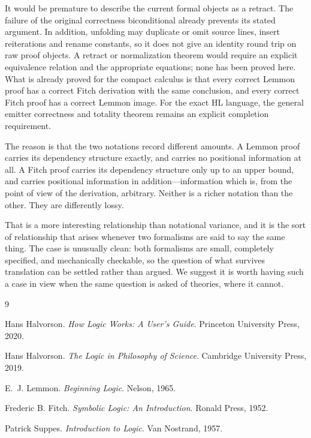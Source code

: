 \documentclass[11pt]{article}
\theoremstyle{plain}
\theoremstyle{definition}
\theoremstyle{remark}
\begin{document}
It would be premature to describe the current formal objects as a retract.
The failure of the original correctness biconditional already prevents its
stated argument. In addition, unfolding may duplicate or omit source lines,
insert reiterations and rename constants, so it does not give an identity
round trip on raw proof objects. A retract or normalization theorem would
require an explicit equivalence relation and the appropriate equations; none
has been proved here. What is already proved for the compact calculus is that
every correct Lemmon proof has a correct Fitch derivation with the same
conclusion, and every correct Fitch proof has a correct Lemmon image. For the
exact HL language, the general emitter correctness and totality theorem
remains an explicit completion requirement.

The reason is that the two notations record different amounts. A Lemmon proof
carries its dependency structure exactly, and carries no positional
information at all. A Fitch proof carries its dependency structure only up to
an upper bound, and carries positional information in addition---information
which is, from the point of view of the derivation, arbitrary. Neither is a
richer notation than the other. They are differently lossy.

That is a more interesting relationship than notational variance, and it is
the sort of relationship that arises whenever two formalisms are said to say
the same thing. The case is unusually clean: both formalisms are small,
completely specified, and mechanically checkable, so the question of what
survives translation can be settled rather than argued. We suggest it is worth
having such a case in view when the same question is asked of theories, where
it cannot.

\begin{thebibliography}{9}

Hans Halvorson.
\emph{How Logic Works: A User's Guide}.
Princeton University Press, 2020.

Hans Halvorson.
\emph{The Logic in Philosophy of Science}.
Cambridge University Press, 2019.

E.~J. Lemmon.
\emph{Beginning Logic}.
Nelson, 1965.

Frederic B. Fitch.
\emph{Symbolic Logic: An Introduction}.
Ronald Press, 1952.

Patrick Suppes.
\emph{Introduction to Logic}.
Van Nostrand, 1957.

\end{thebibliography}
\end{document}
